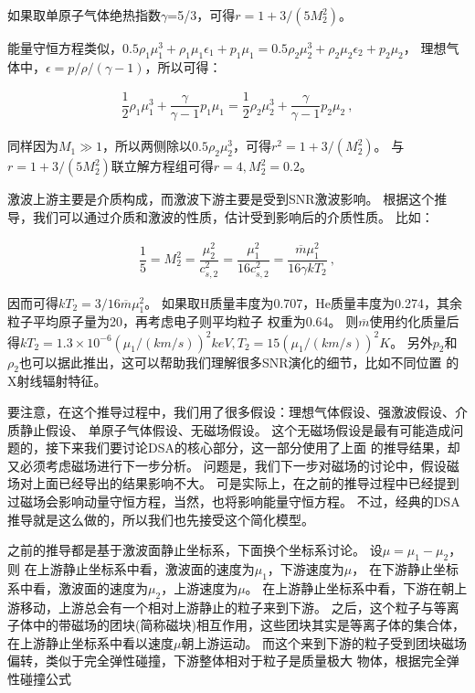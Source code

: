 如果取单原子气体绝热指数$\gamma$=5/3，可得$r=1+3/(5 M_{2}^{2})$。

能量守恒方程类似，$0.5\rho_1\mu_1^3+\rho_1\mu_1\epsilon_1+p_1\mu_1=
0.5\rho_2\mu_2^3+\rho_2\mu_2\epsilon_2+p_2\mu_2$，
理想气体中，$\epsilon=p/\rho/(\gamma-1)$，所以可得：

\begin{equation}
    \begin{aligned}
      \dfrac{1}{2}\rho_1\mu_1^3+\dfrac{\gamma}{\gamma-1}p_1\mu_1=
      \dfrac{1}{2}\rho_2\mu_2^3+\dfrac{\gamma}{\gamma-1}p_2\mu_2\ ,
    \end{aligned}
\end{equation}

同样因为$M_1\gg 1$，所以两侧除以$0.5\rho_2\mu_2^3$，可得$r^2=1+3/(M_{2}^{2})$。
与$r=1+3/(5 M_{2}^{2})$联立解方程组可得$r=4, M_{2}^{2}=0.2$。

激波上游主要是介质构成，而激波下游主要是受到SNR激波影响。
根据这个推导，我们可以通过介质和激波的性质，估计受到影响后的介质性质。
比如：

\begin{equation}
    \begin{aligned}
      \dfrac{1}{5}=M_{2}^{2}=\dfrac{\mu_{2}^{2}}{c_{s, 2}^{2}}=
      \dfrac{\mu_{1}^{2}}{16 c_{s, 2}^{2}}=\dfrac{\overline{m} \mu_{1}^{2}}{16 \gamma k T_{2}}\ ,
    \end{aligned}
\end{equation}

因而可得$k T_{2}=3/16 \overline{m} \mu_{1}^{2}$。
如果取H质量丰度为0.707，He质量丰度为0.274，其余粒子平均原子量为20，再考虑电子则平均粒子
权重为0.64。
则$\overline{m}$使用约化质量后得$k T_{2}=1.3 \times 10^{-6}(\mu_1/(km/s))^2 keV, T_2 =
15 (\mu_1/(km/s))^2 K$。
另外$p_2$和$\rho_2$也可以据此推出，这可以帮助我们理解很多SNR演化的细节，比如不同位置
的X射线辐射特征。

要注意，在这个推导过程中，我们用了很多假设：理想气体假设、强激波假设、介质静止假设、
单原子气体假设、无磁场假设。
这个无磁场假设是最有可能造成问题的，接下来我们要讨论DSA的核心部分，这一部分使用了上面
的推导结果，却又必须考虑磁场进行下一步分析。
问题是，我们下一步对磁场的讨论中，假设磁场对上面已经导出的结果影响不大。
可是实际上，在之前的推导过程中已经提到过磁场会影响动量守恒方程，当然，也将影响能量守恒方程。
不过，经典的DSA推导就是这么做的，所以我们也先接受这个简化模型。

之前的推导都是基于激波面静止坐标系，下面换个坐标系讨论。
设$\mu=\mu_1-\mu_2$，则
在上游静止坐标系中看，激波面的速度为$\mu_1$，下游速度为$\mu$，
在下游静止坐标系中看，激波面的速度为$\mu_2$，上游速度为$\mu$。
在上游静止坐标系中看，下游在朝上游移动，上游总会有一个相对上游静止的粒子来到下游。
之后，这个粒子与等离子体中的带磁场的团块(简称磁块)相互作用，这些团块其实是等离子体的集合体，
在上游静止坐标系中看以速度$\mu$朝上游运动。
而这个来到下游的粒子受到团块磁场偏转，类似于完全弹性碰撞，下游整体相对于粒子是质量极大
物体，根据完全弹性碰撞公式

